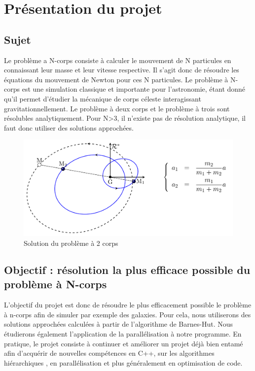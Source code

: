 \chapter{Présentation du projet}
\section{Sujet}
Le problème a N-corps consiste à calculer le mouvement de  N particules en connaissant leur masse et leur vitesse respective.
Il s'agit donc de résoudre les équations du mouvement de Newton pour ces N particules.
Le problème à N-corps est une simulation classique et importante pour l'astronomie, étant donné qu'il permet d'étudier la mécanique de corps céleste interagissant gravitationnellement.
Le problème à deux corps et le problème à trois sont  résolubles analytiquement. Pour N>3, il n'existe pas de résolution analytique, il faut donc utiliser des solutions approchées.

\begin{figure}[!h]
\begin{center}
\includegraphics[width=13cm]{presentation/2_corps.png}
\end{center}
\caption{Solution du problème à 2 corps}
\label{fig1}
\end{figure}

\section{Objectif : résolution la plus efficace possible du problème à N-corps}

L'objectif du projet est donc de résoudre le plus efficacement possible le problème à n-corps afin de simuler par exemple des galaxies.
Pour cela, nous utiliserons des solutions approchées calculées à partir de l'algorithme de Barnes-Hut. Nous étudierons également l'application de la parallélisation à notre programme.
En pratique, le projet consiste à continuer et améliorer un projet déjà bien entamé afin d'acquérir de nouvelles compétences en C++, sur les algorithmes hiérarchiques , en parallélisation et plus généralement en optimisation de code.

